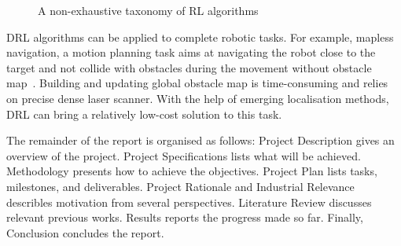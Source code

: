 \begin{figure}[htbp]
   \centering
   
   \caption{A non-exhaustive taxonomy of RL algorithms}
   \label{fig:taxonomy-of-algorithms}
\end{figure}

DRL algorithms can be applied to complete robotic tasks. For example, mapless navigation, a motion planning task aims at navigating the robot close to the target and not collide with obstacles during the movement without obstacle map~\cite{Sim2RealDRL4MaplessNavi}. Building and updating global obstacle map is time-consuming and relies on precise dense laser scanner. With the help of emerging localisation methods, DRL can bring a relatively low-cost solution to this task.

The remainder of the report is organised as follows: Project Description gives an overview of the project. Project Specifications lists what will be achieved. Methodology presents how to achieve the objectives. Project Plan lists tasks, milestones, and deliverables. Project Rationale and Industrial Relevance describles motivation from several perspectives. Literature Review discusses relevant previous works. Results reports the progress made so far. Finally, Conclusion concludes the report.
